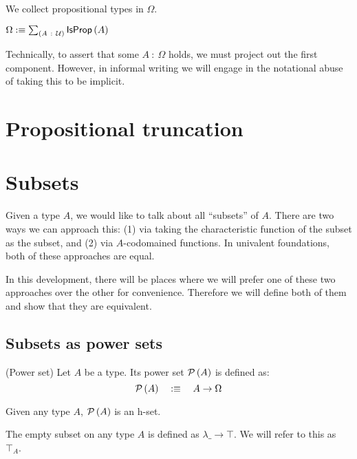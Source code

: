 We collect propositional types in $\Omega$.

\begin{defn}\label{omega}
  $\Omega :\equiv \sum_{(A~:~\mathcal{U})} \mathsf{IsProp}\left(A\right)$
\end{defn}

Technically, to assert that some $A~:~\Omega$ holds, we must project out the first component.
However, in informal writing we will engage in the notational abuse of taking this to be
implicit.

\section{Propositional truncation}

\section{Subsets}

Given a type $A$, we would like to talk about all ``subsets'' of $A$. There are
two ways we can approach this: (1) via taking the characteristic function of the
subset as the subset, and (2) via $A$-codomained functions. In univalent
foundations, both of these approaches are equal.

In this development, there will be places where we will prefer one of these two
approaches over the other for convenience. Therefore we will define both of them
and show that they are equivalent.

\subsection{Subsets as power sets}

\begin{defn}(Power set)\label{defn:pow}
  Let $A$ be a type. Its power set $\mathcal{P}\left(A\right)$ is defined as:
  \begin{equation*}
    \mathcal{P}\left(A\right) \quad:\equiv\quad A \rightarrow \Omega
  \end{equation*}
\end{defn}

\begin{prop}\label{isSetPow}
  Given any type $A$, $\mathcal{P}\left(A\right)$ is an h-set.
\end{prop}

\begin{defn}\label{defn:full-set}
  The empty subset on any type $A$ is defined as $\lambda \_ \rightarrow \top$. We will refer to this as
  $\top_A$.
\end{defn}

